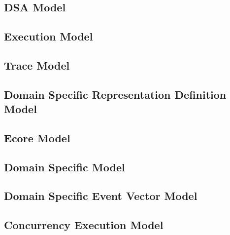 \documentclass{gemoc} %
\begin{document}

\subsection{DSA Model}


\subsection{Execution Model}


\subsection{Trace Model}


\subsection{Domain Specific  Representation Definition Model}


\subsection{Ecore Model}


\subsection{Domain Specific Model}


\subsection{Domain Specific Event Vector Model}


\subsection{Concurrency Execution Model}
\end{document}
